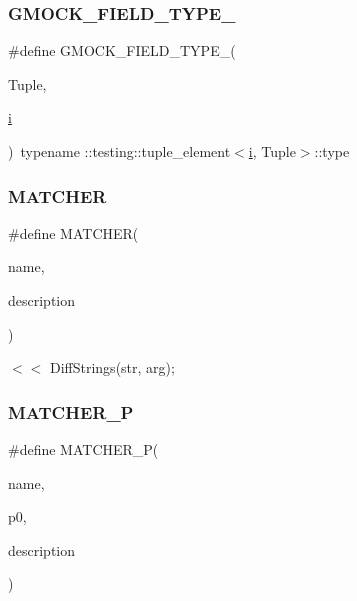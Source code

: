 \subsubsection{\texorpdfstring{GMOCK\_FIELD\_TYPE\_}{GMOCK\_FIELD\_TYPE\_}}
{\footnotesize\ttfamily \#define G\+M\+O\+C\+K\+\_\+\+F\+I\+E\+L\+D\+\_\+\+T\+Y\+P\+E\+\_\+(\begin{DoxyParamCaption}\item[{}]{Tuple,  }\item[{}]{\mbox{\hyperlink{_obj__test_2lib_2googletest-master_2googlemock_2test_2gmock-matchers__test_8cc_acb559820d9ca11295b4500f179ef6392}{i}} }\end{DoxyParamCaption})~typename \+::testing\+::tuple\+\_\+element$<$\mbox{\hyperlink{_obj__test_2lib_2googletest-master_2googlemock_2test_2gmock-matchers__test_8cc_acb559820d9ca11295b4500f179ef6392}{i}}, Tuple$>$\+::type}

\mbox{\label{_obj__test_2lib_2googletest-release-1_88_81_2googlemock_2include_2gmock_2gmock-generated-matchers_8h_af4fe73ff8e2b0494f4970b575b65ddff}} 
\subsubsection{\texorpdfstring{MATCHER}{MATCHER}}
{\footnotesize\ttfamily \#define M\+A\+T\+C\+H\+ER(\begin{DoxyParamCaption}\item[{}]{name,  }\item[{}]{description }\end{DoxyParamCaption})}



$<$$<$ Diff\+Strings(str, arg); 

\mbox{\label{_obj__test_2lib_2googletest-release-1_88_81_2googlemock_2include_2gmock_2gmock-generated-matchers_8h_acb7ae915efa2fd8d3f6ea7313198afb6}} 
\subsubsection{\texorpdfstring{MATCHER\_P}{MATCHER\_P}}
{\footnotesize\ttfamily \#define M\+A\+T\+C\+H\+E\+R\+\_\+P(\begin{DoxyParamCaption}\item[{}]{name,  }\item[{}]{p0,  }\item[{}]{description }\end{DoxyParamCaption})}

